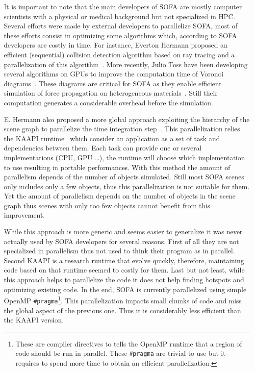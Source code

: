 It is important to note that the main developers of \gls{SOFA} are  mostly computer scientists with a physical or medical background but not specialized in \gls{HPC}.
Several efforts were made by external developers to parallelize \gls{SOFA}, most of these efforts consist in optimizing some algorithms which, according to \gls{SOFA} developers are costly in time.
For instance, Everton Hermann proposed an efficient (sequential) collision detection algorithm based on ray tracing and a parallelization of this algorithm~\cite{Hermann08Raytraced}.
More recently, Julio Toss have been developing several algorithms on \glspl{GPU} to improve the computation time of Voronoi diagrams~\cite{Toss13Parallel,Toss14Parallel}.
These diagrams are critical for \gls{SOFA} as they enable efficient simulation of force propagation on heterogeneous materials~\cite{Faure11Sparse}.
Still their computation generates a considerable overhead before the simulation.

E. Hermann also proposed a more global approach exploiting the hierarchy of the scene graph to parallelize the time integration step~\cite{Hermann09Interactive}.
This parallelization relies the \gls{KAAPI} runtime~\cite{Gautier07KAAPI} which consider an application as a set of task and dependencies between them.
Each task can provide one or several implementations (\gls{CPU}, \gls{GPU} \ldots), the runtime will choose which implementation to use resulting in portable performances.
With this method the amount of parallelism depends of the number of objects simulated.
Still most \gls{SOFA} scenes only includes only a few objects, thus this parallelization is not suitable for them.
Yet the amount of parallelism depends on the number of objects in the scene graph thus scenes with only too few objects cannot benefit from this improvement.


While this approach is more generic and seems easier to generalize it was never actually used by \gls{SOFA} developers for several reasons.
First of all they are not specialized in parallelism thus not used to think their program as in parallel.
Second \gls{KAAPI} is a research runtime that evolve quickly, therefore, maintaining code based on that runtime seemed to costly for them.
Last but not least, while this approach helps to parallelize the code it does not help finding hotspots and optimizing existing code.
In the end, \gls{SOFA} is currently parallelized using simple \gls{OpenMP} \texttt{\#pragma}\footnote{
    These are compiler directives to tells the \gls{OpenMP} runtime that a region of code should be run in parallel.
    These \texttt{\#pragma} are trivial to use but it requires to spend more time to obtain an efficient parallelization.}.
This parallelization impacts small chunks of code and miss the global aspect of the previous one.
Thus it is considerably less efficient than the \gls{KAAPI} version.

